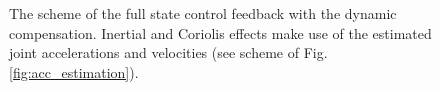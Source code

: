 	\begin{figure}[]
		\centering
		\def\svgwidth{1\columnwidth}
		\begin{footnotesize}
			
		\end{footnotesize}
		\caption{The scheme of the full state control feedback with the dynamic compensation. Inertial and Coriolis effects make use of the estimated joint accelerations and velocities (see scheme of Fig. \ref{fig:acc_estimation}). }
		\label{fig:fullstate}
	\end{figure}
	
